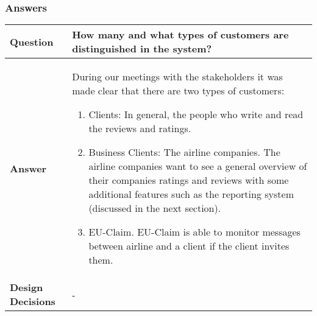 \subsubsection{Answers}
\begin{longtable}{| l |  p{12cm} |}
\hline
\textbf{Question} & \textbf{How many and what types of customers are distinguished in the system?} \\ \hline
\textbf{Answer} & During our meetings with the stakeholders it was made clear that there are two types of customers:
	\begin{enumerate} 
	\item Clients: In general, the people who write and read the reviews and ratings.
	\item Business Clients: The airline companies. The airline companies want to see a general overview of their companies ratings 			and reviews with some additional features such as the 
	reporting system (discussed in the next section).
	\item EU-Claim. EU-Claim is able to monitor messages between airline and a client if the client invites them.
	\end{enumerate} \\ \hline
\textbf{Design Decisions} & - \\ \hline
\end{longtable}

